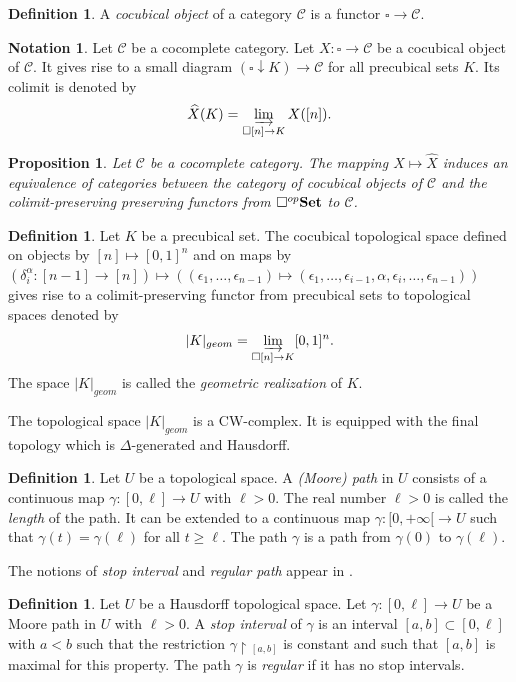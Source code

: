 \documentclass[a4paper,12pt]{amsart}
\newcommand{\C}{\mathcal{C}}
\newtheorem{prop}[thm]{Proposition}
\newcommand{\bp}{\begin{prop}}
\newcommand{\ep}{\end{prop}}
\theoremstyle{definition}
\newtheorem{defn}[thm]{Definition}
\newcommand{\bd}{\begin{defn}}
\newcommand{\ed}{\end{defn}}
\newtheorem{nota}[thm]{Notation}
\renewcommand{\geq}{\geqslant}
\newcommand{\brm}[1]{{\rm{\mathbf{#1}}}}
\newcommand{\set}{{\brm{Set}}}
\newcommand{\liminj}{\varinjlim}
\newcommand{\rest}{\!\upharpoonright\!}
\newcommand{\ddownarrow}{{\downarrow}}
\begin{document}
\bd
A \textit{cocubical object} of a category $\C$ is a functor $\square\to \C$.
\ed



\begin{nota}
	Let $\C$ be a cocomplete category. Let $X:\square\to \C$ be a cocubical object of $\C$. It gives rise to a small diagram $(\square\ddownarrow K) \to \C$ for all precubical sets $K$. Its colimit is denoted by \[\widehat{X}(K)=\liminj_{\square[n]\to K} X([n]).\]
\end{nota}


\bp \cite[Proposition~2.3.2]{realization} \label{eq-cat}
Let $\C$ be a cocomplete category. The mapping $X\mapsto \widehat{X}$ induces an equivalence of categories between the category of cocubical objects of $\C$ and the colimit-preserving preserving functors from $\square^{op}\set$ to $\C$.
\ep


\bd \label{geom}
Let $K$ be a precubical set. The cocubical topological space defined on objects by $[n]\mapsto [0,1]^n$ and on maps by 
$(\delta_i^\alpha : [n-1] \rightarrow [n])\mapsto ((\epsilon_1, \dots, \epsilon_{n-1})\mapsto (\epsilon_1,\dots, \epsilon_{i-1}, \alpha, \epsilon_i, \dots, \epsilon_{n-1}))$ gives rise to a colimit-preserving functor from precubical sets to topological spaces denoted by 
\[
|K|_{geom} = \liminj_{\square[n]\to K} [0,1]^n.
\]
The space $|K|_{geom}$ is called the \textit{geometric realization} of $K$.
\ed

The topological space $|K|_{geom}$ is a CW-complex. It is equipped with the final topology which is $\Delta$-generated and Hausdorff.


\bd
Let $U$ be a topological space. A \textit{(Moore) path} in $U$ consists of a continuous map $\gamma:[0,\ell]\to U$ with $\ell>0$. The real number $\ell>0$ is called the \textit{length} of the path. It can be extended to a continuous map $\gamma:[0,+\infty[\to U$ such that $\gamma(t)=\gamma(\ell)$ for all $t\geq \ell$. The path $\gamma$ is a path from $\gamma(0)$ to $\gamma(\ell)$.
\ed

The notions of \textit{stop interval} and \textit{regular path} appear in \cite[Definition~1.1]{reparam}.


\bd \label{regular}
Let $U$ be a Hausdorff topological space. Let $\gamma:[0,\ell]\to U$ be a Moore path in $U$ with $\ell>0$. A \textit{stop interval} of $\gamma$ is an interval $[a,b]\subset [0,\ell]$ with $a<b$ such that the restriction $\gamma\rest_{[a,b]}$ is constant and such that $[a,b]$ is maximal for this property. The path $\gamma$ is \textit{regular} if it has no stop intervals.
\ed
\end{document}
